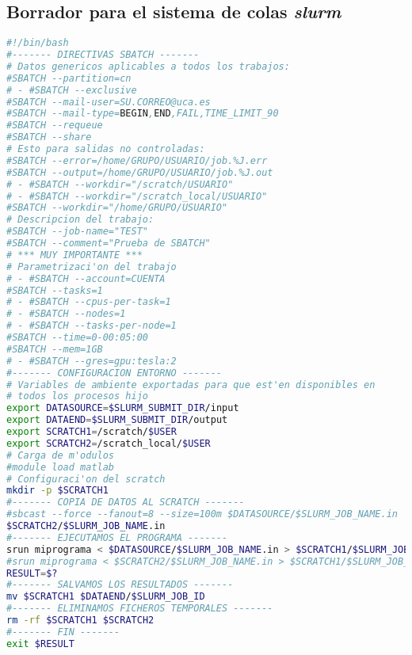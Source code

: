 \documentclass[11pt]{article}
\begin{document}
\subsection*{Borrador para el sistema de colas \textit{slurm}}
    \begin{lstlisting}[language=sh]
#!/bin/bash
#------- DIRECTIVAS SBATCH -------
# Datos genericos aplicables a todos los trabajos:
#SBATCH --partition=cn
# - #SBATCH --exclusive
#SBATCH --mail-user=SU.CORREO@uca.es
#SBATCH --mail-type=BEGIN,END,FAIL,TIME_LIMIT_90
#SBATCH --requeue
#SBATCH --share
# Esto para salidas no controladas:
#SBATCH --error=/home/GRUPO/USUARIO/job.%J.err
#SBATCH --output=/home/GRUPO/USUARIO/job.%J.out
# - #SBATCH --workdir="/scratch/USUARIO"
# - #SBATCH --workdir="/scratch_local/USUARIO"
#SBATCH --workdir="/home/GRUPO/USUARIO"
# Descripcion del trabajo:
#SBATCH --job-name="TEST"
#SBATCH --comment="Prueba de SBATCH"
# *** MUY IMPORTANTE ***
# Parametrizaci'on del trabajo
# - #SBATCH --account=CUENTA
#SBATCH --tasks=1
# - #SBATCH --cpus-per-task=1
# - #SBATCH --nodes=1
# - #SBATCH --tasks-per-node=1
#SBATCH --time=0-00:05:00
#SBATCH --mem=1GB
# - #SBATCH --gres=gpu:tesla:2
#------- CONFIGURACION ENTORNO -------
# Variables de ambiente exportadas para que est'en disponibles en
# todos los procesos hijo
export DATASOURCE=$SLURM_SUBMIT_DIR/input
export DATAEND=$SLURM_SUBMIT_DIR/output
export SCRATCH1=/scratch/$USER
export SCRATCH2=/scratch_local/$USER
# Carga de m'odulos
#module load matlab
# Configuraci'on del scratch
mkdir -p $SCRATCH1
#------- COPIA DE DATOS AL SCRATCH -------
#sbcast --force --fanout=8 --size=100m $DATASOURCE/$SLURM_JOB_NAME.in
$SCRATCH2/$SLURM_JOB_NAME.in
#------- EJECUTAMOS EL PROGRAMA -------
srun miprograma < $DATASOURCE/$SLURM_JOB_NAME.in > $SCRATCH1/$SLURM_JOB_NAME.out
#srun miprograma < $SCRATCH2/$SLURM_JOB_NAME.in > $SCRATCH1/$SLURM_JOB_NAME.out
RESULT=$?
#------- SALVAMOS LOS RESULTADOS -------
mv $SCRATCH1 $DATAEND/$SLURM_JOB_ID
#------- ELIMINAMOS FICHEROS TEMPORALES -------
rm -rf $SCRATCH1 $SCRATCH2
#------- FIN -------
exit $RESULT
\end{lstlisting}
\end{document}

